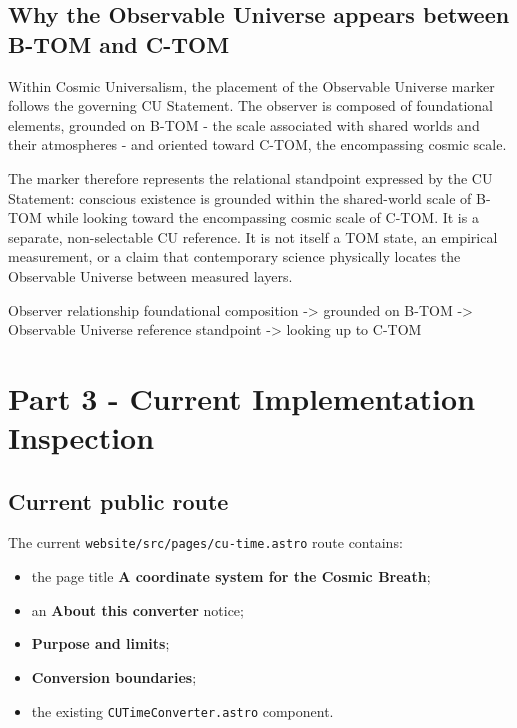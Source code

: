 \documentclass[11pt,letterpaper]{article}
\newcommand{\filepath}[1]{\nolinkurl{#1}}
\newcommand{\term}[1]{\textbf{\textsf{#1}}}
\begin{document}
\subsection{Why the Observable Universe appears between B-TOM and C-TOM}

Within Cosmic Universalism, the placement of the Observable Universe marker
follows the governing CU Statement. The observer is composed of foundational
elements, grounded on B-TOM - the scale associated with shared worlds and their
atmospheres - and oriented toward C-TOM, the encompassing cosmic scale.

The marker therefore represents the relational standpoint expressed by the CU
Statement: conscious existence is grounded within the shared-world scale of
B-TOM while looking toward the encompassing cosmic scale of C-TOM. It is a
separate, non-selectable CU reference. It is not itself a TOM state, an
empirical measurement, or a claim that contemporary science physically locates
the Observable Universe between measured layers.

\begin{codebox}{Observer relationship}
foundational composition
  -> grounded on B-TOM
  -> Observable Universe reference standpoint
  -> looking up to C-TOM
\end{codebox}

\section{Part 3 - Current Implementation Inspection}

\subsection{Current public route}

The current \filepath{website/src/pages/cu-time.astro} route contains:

\begin{itemize}
    \item the page title \term{A coordinate system for the Cosmic Breath};
    \item an \term{About this converter} notice;
    \item \term{Purpose and limits};
    \item \term{Conversion boundaries};
    \item the existing \filepath{CUTimeConverter.astro} component.
\end{itemize}
\end{document}

